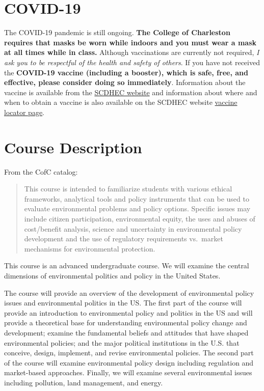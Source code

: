 \hypertarget{covid-19}{%
\section{COVID-19}\label{covid-19}}

The COVID-19 pandemic is still ongoing. \textbf{The College of
Charleston requires that masks be worn while indoors and you must wear a
mask at all times while in class.} Although vaccinations are currently
not required, \emph{I ask you to be respectful of the health and safety
of others}. If you have not received the \textbf{COVID-19 vaccine
(including a booster), which is safe, free, and effective, please
consider doing so immediately}. Information about the vaccine is
available from the
\href{https://scdhec.gov/covid19/covid-19-vaccine}{SCDHEC website} and
information about where and when to obtain a vaccine is also available
on the SCDHEC website \href{https://vaxlocator.dhec.sc.gov/}{vaccine
locator page}.

\hypertarget{course-description}{%
\section{Course Description}\label{course-description}}

From the CofC catalog:

\begin{quote}
This course is intended to familiarize students with various ethical
frameworks, analytical tools and policy instruments that can be used to
evaluate environmental problems and policy options. Specific issues may
include citizen participation, environmental equity, the uses and abuses
of cost/benefit analysis, science and uncertainty in environmental
policy development and the use of regulatory requirements vs.~market
mechanisms for environmental protection.
\end{quote}

\vspace{0.1in}

\noindent This course is an advanced undergraduate course. We will
examine the central dimensions of environmental politics and policy in
the United States.

\vspace{0.1in}

\noindent The course will provide an overview of the development of
environmental policy issues and environmental politics in the US. The
first part of the course will provide an introduction to environmental
policy and politics in the US and will provide a theoretical base for
understanding environmental policy change and development; examine the
fundamental beliefs and attitudes that have shaped environmental
policies; and the major political institutions in the U.S. that
conceive, design, implement, and revise environmental policies. The
second part of the course will examine environmental policy design
including regulation and market-based approaches. Finally, we will
examine several environmental issues including pollution, land
management, and energy.

